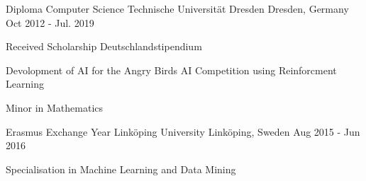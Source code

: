 \begin{cventries}
	\cventry
	{Diploma Computer Science} %
	{Technische Universität Dresden} %
	{Dresden, Germany} %
	{Oct 2012 - Jul. 2019} %
	{
		\begin{cvitems} %
			\item {Received Scholarship Deutschlandstipendium}
			\item{Devolopment of AI for the Angry Birds AI Competition using Reinforcment Learning}
			\item{Minor in Mathematics}
		\end{cvitems}
	}

	\cventry
	{Erasmus Exchange Year} %
	{Linköping University} %
	{Linköping, Sweden} %
	{Aug 2015 - Jun 2016} %
	{
		\begin{cvitems} %
			\item{Specialisation in Machine Learning and Data Mining}
		\end{cvitems}
	}
\end{cventries}
